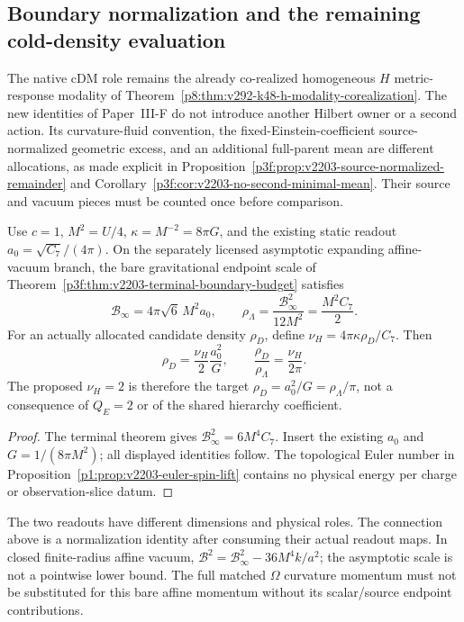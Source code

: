\documentclass[12pt,a4paper]{article}
\begin{document}




\subsection{Boundary normalization and the remaining cold-density evaluation}
\label{p9:sec:v2203-boundary-readout}
The native cDM role remains the already co-realized homogeneous \(H\)
metric-response modality of
Theorem~\ref{p8:thm:v292-k48-h-modality-corealization}. The new identities
of Paper~III-F do not introduce another Hilbert owner or a second action.
Its curvature-fluid convention, the fixed-Einstein-coefficient
source-normalized geometric excess, and an additional full-parent mean
are different allocations, as made explicit in
Proposition~\ref{p3f:prop:v2203-source-normalized-remainder} and
Corollary~\ref{p3f:cor:v2203-no-second-minimal-mean}.
Their source and vacuum pieces must be counted once before comparison.

\begin{corollary}
\label{p9:cor:v2203-rar-boundary-normalization}
Use \(c=1\), \(M^2=U/4\), \(\kappa=M^{-2}=8\pi G\), and the
existing static readout \(a_0=\sqrt{C_7}/(4\pi)\). On the separately
licensed asymptotic expanding affine-vacuum branch, the bare gravitational
endpoint scale of Theorem~\ref{p3f:thm:v2203-terminal-boundary-budget}
satisfies
\[
 \boxed{\mathcal B_\infty=4\pi\sqrt6\,M^2a_0,
 \qquad \rho_\Lambda=\frac{\mathcal B_\infty^2}{12M^2}
 =\frac{M^2C_7}{2}.}
\]
For an actually allocated candidate density \(\rho_D\), define
\(\nu_H=4\pi\kappa\rho_D/C_7\). Then
\[
 \rho_D=\frac{\nu_H}{2}\frac{a_0^2}{G},\qquad
 \frac{\rho_D}{\rho_\Lambda}=\frac{\nu_H}{2\pi}.
\]
The proposed \(\nu_H=2\) is therefore the target
\(\rho_D=a_0^2/G=\rho_\Lambda/\pi\), not a consequence of
\(Q_E=2\) or of the shared hierarchy coefficient.
\end{corollary}
\begin{proof}
The terminal theorem gives \(\mathcal B_\infty^2=6M^4C_7\).
Insert the existing \(a_0\) and \(G=1/(8\pi M^2)\); all displayed
identities follow. The topological Euler number in
Proposition~\ref{p1:prop:v2203-euler-spin-lift} contains no physical
energy per charge or observation-slice datum.
\end{proof}
The two readouts have different dimensions and physical roles. The
connection above is a normalization identity after consuming their actual
readout maps. In closed finite-radius affine vacuum,
\(\mathcal B^2=\mathcal B_\infty^2-36M^4k/a^2\); the asymptotic
scale is not a pointwise lower bound. The full matched
\(\Omega\) curvature momentum must not be substituted for this bare
affine momentum without its scalar/source endpoint contributions.
\end{document}
